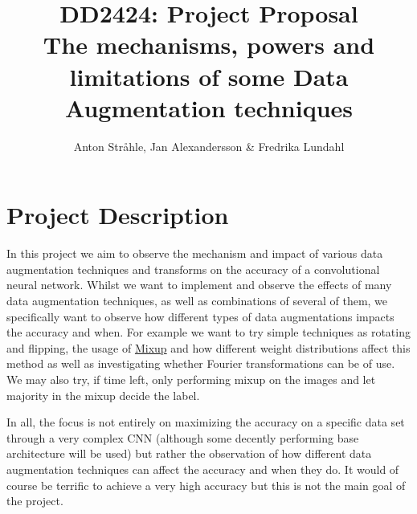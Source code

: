 \documentclass{article}
\begin{document}
\title{DD2424: Project Proposal \\
The mechanisms, powers and limitations of some Data Augmentation techniques}

\author{Anton Stråhle, Jan Alexandersson \& Fredrika Lundahl}
\maketitle 

\section{Project Description}


In this project we aim to observe the mechanism and impact of various data augmentation techniques and transforms on the accuracy of a convolutional neural network. Whilst we want to implement and observe the effects of many data augmentation techniques, as well as combinations of several of them, we specifically want to observe how different types of data augmentations impacts the accuracy and when. For example we want to try simple techniques as rotating and flipping, the usage of \href{https://arxiv.org/pdf/1710.09412.pdf}{Mixup} and how different weight distributions affect this method as well as investigating whether Fourier transformations can be of use. 
We may also try, if time left, only performing mixup on the images and let majority in the mixup decide the label.

\medskip

In all, the focus is not entirely on maximizing the accuracy on a specific data set through a very complex CNN (although some decently performing base architecture will be used) but rather the observation of how different data augmentation techniques can affect the accuracy and when they do. It would of course be terrific to achieve a very high accuracy but this is not the main goal of the project.
\end{document}
